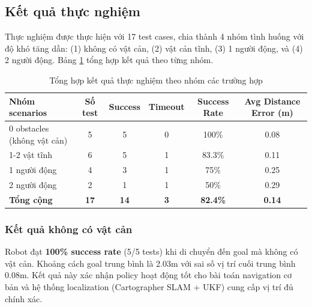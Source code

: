 \subsection{Kết quả thực nghiệm}
\label{subsec:exp_results}

Thực nghiệm được thực hiện với 17 test cases, chia thành 4 nhóm tình huống với độ khó tăng dần: (1) không có vật cản, (2) vật cản tĩnh, (3) 1 người động, và (4) 2 người động. Bảng \ref{tab:real_robot_summary} tổng hợp kết quả theo từng nhóm.

\begin{table}[H]
\centering
\caption{Tổng hợp kết quả thực nghiệm theo nhóm các trường hợp}
\label{tab:real_robot_summary}
\begin{tabular}{lccccc}
\hline
\textbf{Nhóm scenarios} & \textbf{Số test} & \textbf{Success} & \textbf{Timeout} & \textbf{Success Rate} & \textbf{Avg Distance Error (m)} \\
\hline
0 obstacles (không vật cản) & 5 & 5 & 0 & 100\% & 0.08 \\
1-2 vật tĩnh & 6 & 5 & 1 & 83.3\% & 0.11 \\
1 người động & 4 & 3 & 1 & 75\% & 0.25 \\
2 người động & 2 & 1 & 1 & 50\% & 0.29 \\
\hline
\textbf{Tổng cộng} & \textbf{17} & \textbf{14} & \textbf{3} & \textbf{82.4\%} & \textbf{0.14} \\
\hline
\end{tabular}
\end{table}

\subsubsection{Kết quả không có vật cản}

Robot đạt \textbf{100\% success rate} (5/5 tests) khi di chuyển đến goal mà không có vật cản. Khoảng cách goal trung bình là 2.03m với sai số vị trí cuối trung bình 0.08m. Kết quả này xác nhận policy hoạt động tốt cho bài toán navigation cơ bản và hệ thống localization (Cartographer SLAM + UKF) cung cấp vị trí đủ chính xác.

